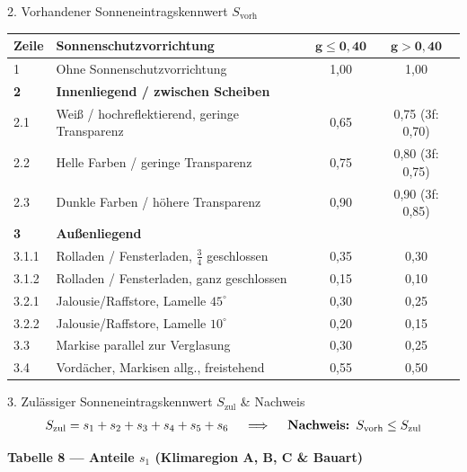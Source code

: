 \documentclass[11pt,a4paper]{article}
\begin{document}
{\begin{formelbox}{2. Vorhandener Sonneneintragskennwert $S_{\text{vorh}}$}
    {\tiny
    \renewcommand{\arraystretch}{0.9}
    \setlength{\tabcolsep}{2pt}
    \begin{tabularx}{\linewidth}{|l|>{\raggedright\arraybackslash}X|c|c|}
        \hline
        \textbf{Zeile} & \textbf{Sonnenschutzvorrichtung} & $\boldsymbol{g \le 0{,}40}$ & $\boldsymbol{g > 0{,}40}$ \\
        \hline
        1 & Ohne Sonnenschutzvorrichtung & 1,00 & 1,00 \\
        \hline
        \textbf{2} & \textbf{Innenliegend / zwischen Scheiben} & & \\
        \hline
        2.1 & Weiß / hochreflektierend, geringe Transparenz & 0,65 & 0,75 (3f: 0,70) \\
        \hline
        2.2 & Helle Farben / geringe Transparenz & 0,75 & 0,80 (3f: 0,75) \\
        \hline
        2.3 & Dunkle Farben / höhere Transparenz & 0,90 & 0,90 (3f: 0,85) \\
        \hline
        \textbf{3} & \textbf{Außenliegend} & & \\
        \hline
        3.1.1 & Rolladen / Fensterladen, $\frac{3}{4}$ geschlossen & 0,35 & 0,30 \\
        \hline
        3.1.2 & Rolladen / Fensterladen, ganz geschlossen & 0,15 & 0,10 \\
        \hline
        3.2.1 & Jalousie/Raffstore, Lamelle $45^\circ$ & 0,30 & 0,25 \\
        \hline
        3.2.2 & Jalousie/Raffstore, Lamelle $10^\circ$ & 0,20 & 0,15 \\
        \hline
        3.3 & Markise parallel zur Verglasung & 0,30 & 0,25 \\
        \hline
        3.4 & Vordächer, Markisen allg., freistehend & 0,55 & 0,50 \\
        \hline
    \end{tabularx}
    }
\end{formelbox}

\begin{formelbox}{3. Zulässiger Sonneneintragskennwert $S_{\text{zul}}$ \& Nachweis}
    \begin{align*}
        S_{\text{zul}} = s_1 + s_2 + s_3 + s_4 + s_5 + s_6 \quad \implies \quad \text{\textbf{Nachweis: }} S_{\text{vorh}} \le S_{\text{zul}}
    \end{align*}
    
    \textbf{\tiny Tabelle 8 — Anteile $s_1$ (Klimaregion A, B, C \& Bauart)}
    

\end{formelbox}}
\end{document}
